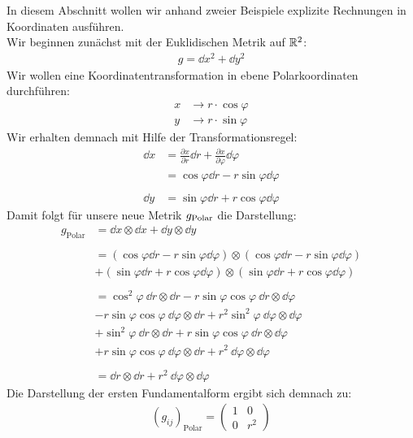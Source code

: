 
In diesem Abschnitt wollen wir anhand zweier Beispiele explizite Rechnungen in Koordinaten ausführen. \\
Wir beginnen zunächst mit der Euklidischen Metrik auf $\mathbb{R}^2$:
\begin{align}
g=\dd x^2 + \dd y^2
\end{align}
Wir wollen eine Koordinatentransformation in ebene Polarkoordinaten durchführen:
\begin{align*}
x &\longrightarrow r\cdot \cos\varphi \\
y &\longrightarrow r\cdot \sin\varphi
\end{align*}
Wir erhalten demnach mit Hilfe der Transformationsregel:
\begin{align*}
\dd x &= \frac{\partial x}{\partial r} \dd r + \frac{\partial x}{\partial \varphi} \dd \varphi \\
&= \cos\varphi\dd r - r\sin\varphi\dd\varphi \\
\phantom{.}\\
\dd y &= \sin\varphi\dd r + r\cos\varphi\dd\varphi
\end{align*}
Damit folgt für unsere neue Metrik $g_{\tiny\text{Polar}}$ die Darstellung:
\begin{align*}
g_{\text{Polar}} &= \dd x \otimes \dd x + \dd y \otimes \dd y \\
\phantom{.}\\
&= (\cos\varphi\dd r - r\sin\varphi\dd\varphi) \otimes (\cos\varphi\dd r - r\sin\varphi\dd\varphi) \\ &+ (\sin\varphi\dd r + r\cos\varphi\dd\varphi) \otimes (\sin\varphi\dd r + r\cos\varphi\dd\varphi) \\
\phantom{.}\\
&= \cos^2\varphi \ \dd r \otimes \dd r - r\sin\varphi\cos\varphi \ \dd r \otimes \dd \varphi \\
&- r\sin\varphi\cos\varphi \ \dd \varphi \otimes \dd r + r^2\sin^2\varphi \ \dd\varphi \otimes \dd\varphi \\
&+ \sin^2\varphi \ \dd r \otimes \dd r + r\sin\varphi\cos\varphi \ \dd r \otimes \dd\varphi \\
&+ r \sin\varphi\cos\varphi \ \dd\varphi \otimes \dd r + r^2 \ \dd\varphi \otimes \dd\varphi \\
\phantom{.}\\
&= \dd r \otimes \dd r + r^2 \ \dd\varphi \otimes \dd\varphi
\end{align*}
Die Darstellung der ersten Fundamentalform ergibt sich demnach zu:
\begin{align}
\left(g_{ij}\right)_{\text{Polar}} = 
\begin{pmatrix}
1 & 0 \\
0 & r^2
\end{pmatrix}
\end{align}
